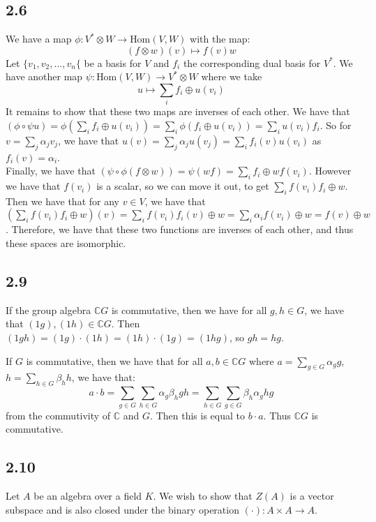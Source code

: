 \documentclass[]{article}
\begin{document}
\subsection*{2.6}
We have a map $\phi: V^* \otimes W \rightarrow \text{Hom}(V, W)$ with the map:
\begin{equation}
	(f \otimes w)(v) \mapsto f(v) w
\end{equation}
Let $\lbrace v_1, v_2, ... , v_n \lbrace$ be a basis for $V$ and $f_i$ the corresponding dual basis for $V^*$.
We have another map $\psi: \text{Hom}(V, W) \rightarrow V^* \otimes W$ where we take
\begin{equation}
	u \mapsto \sum_i f_i \oplus u(v_i)
\end{equation}
It remains to show that these two maps are inverses of each other. 
We have that $(\phi \circ \psi u) = \phi(\sum_i f_i \oplus u(v_i))= \sum_i \phi(f_i \oplus u(v_i)) = \sum_i u(v_i) f_i$. So for $v = \sum_j \alpha_j v_j$, we have that $u(v) = \sum_j \alpha_j u(v_j) = \sum_i f_i(v) u(v_i)$ as $f_i(v) = \alpha_i$. 
\\
Finally, we have that 
$(\psi \circ \phi (f \otimes w)) = \psi(w f) = \sum_i f_i \oplus w f(v_i)$. However we have that $f(v_i)$ is a scalar, so we can move it out, to get $\sum_i f(v_i) f_i \oplus w$. Then we have that for any $v \in V$, we have that $(\sum_i f(v_i) f_i \oplus w) (v) = \sum_i f(v_i) f_i(v) \oplus w = \sum_i \alpha_i f(v_i) \oplus w = f(v) \oplus w$.
Therefore, we have that these two functions are inverses of each other, and thus these spaces are isomorphic. 
\subsection*{2.9}
If the group algebra $\mathbb{C} G$ is commutative, then we have for all $g, h \in G$, we have that $(1 g), (1 h) \in \mathbb{C}G$. Then $(1 gh) = (1 g)\cdot (1 h) = (1 h) \cdot (1 g) = (1 hg)$, so $gh = hg$. 
\par
If $G$ is commutative, then we have that for all $a, b \in \mathbb{C} G$ where $a = \sum_{g \in G} \alpha_g g$, $h = \sum_{h \in G} \beta_h h$, we have that:
\begin{equation}
	a \cdot b = \sum_{g \in G} \sum_{h \in G} \alpha_g \beta_h gh = \sum_{h \in G} \sum_{g \in G} \beta_h\alpha_g  hg
\end{equation} from the commutivity of $\mathbb{C}$ and $G$.
Then this is equal to $b \cdot a$. Thus $\mathbb{C}G$ is commutative. 
\subsection*{2.10}
Let $A$ be an algebra over a field $K$.
We wish to show that $Z(A)$ is a vector subspace and is also closed under the binary operation $(\cdot) : A \times A \rightarrow A$. 
\end{document}
